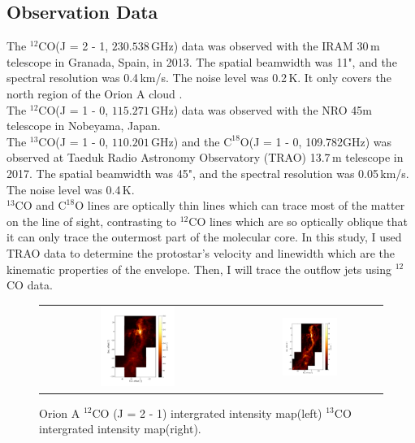 \documentclass[twoside,11pt]{gshs_thesis}
\begin{document}
\subsection{Observation Data}
The $^{12}$CO(J = 2 - 1, $230.538\,$GHz) data was observed with the IRAM 30$\,$m telescope in Granada, Spain, in 2013. The spatial beamwidth was 11", and the spectral resolution was 0.4$\,$km/s. The noise level was 0.2$\,$K. It only covers the north region of the Orion A cloud \cite{Berne}. \\
The $^{12}$CO(J = 1 - 0, $115.271\,$GHz) data was observed with the NRO 45m telescope in Nobeyama, Japan.  \\
The $^{13}$CO(J = 1 - 0, $110.201\,$GHz) and the $\textrm{C}^{18}\textrm{O}$(J = 1 - 0, 109.782GHz) was observed at Taeduk Radio Astronomy Observatory (TRAO) 13.7$\,$m telescope in 2017. The spatial beamwidth was 45", and the spectral resolution was 0.05$\,$km/s. The noise level was 0.4$\,$K.\\
$^{13}$CO and $\textrm{C}^{18}\textrm{O}$ lines are optically thin lines which can trace most of the matter on the line of sight, contrasting to $^{12}$CO lines which are so optically oblique that it can only trace the outermost part of the molecular core. In this study, I used TRAO data to determine the protostar's velocity and linewidth which are the kinematic properties of the envelope. Then, I will trace the outflow jets using $^{12}$CO data.
\begin{figure}[h]
	\begin{center}
		\begin{tabular}{cc}
			\includegraphics[width=0.4\textwidth]{RNE_12CO_Orion.png} & \includegraphics[width=0.4\textwidth]{Orion_13CO_intmap.png}
		\end{tabular}
	\end{center}
	\caption{Orion A $^{12}$CO (J = 2 - 1) intergrated intensity map(left) $^{13}$CO intergrated intensity map(right).}
\end{figure}
\end{document}

